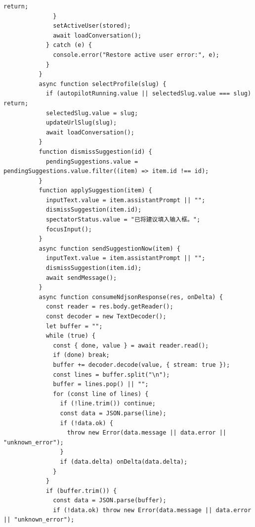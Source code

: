 \documentclass[12pt,a4paper]{article}
\begin{document}
\begin{Verbatim}[fontsize=\footnotesize]
                return;
              }
              setActiveUser(stored);
              await loadConversation();
            } catch (e) {
              console.error("Restore active user error:", e);
            }
          }
          async function selectProfile(slug) {
            if (autopilotRunning.value || selectedSlug.value === slug) return;
            selectedSlug.value = slug;
            updateUrlSlug(slug);
            await loadConversation();
          }
          function dismissSuggestion(id) {
            pendingSuggestions.value = pendingSuggestions.value.filter((item) => item.id !== id);
          }
          function applySuggestion(item) {
            inputText.value = item.assistantPrompt || "";
            dismissSuggestion(item.id);
            spectatorStatus.value = "已将建议填入输入框。";
            focusInput();
          }
          async function sendSuggestionNow(item) {
            inputText.value = item.assistantPrompt || "";
            dismissSuggestion(item.id);
            await sendMessage();
          }
          async function consumeNdjsonResponse(res, onDelta) {
            const reader = res.body.getReader();
            const decoder = new TextDecoder();
            let buffer = "";
            while (true) {
              const { done, value } = await reader.read();
              if (done) break;
              buffer += decoder.decode(value, { stream: true });
              const lines = buffer.split("\n");
              buffer = lines.pop() || "";
              for (const line of lines) {
                if (!line.trim()) continue;
                const data = JSON.parse(line);
                if (!data.ok) {
                  throw new Error(data.message || data.error || "unknown_error");
                }
                if (data.delta) onDelta(data.delta);
              }
            }
            if (buffer.trim()) {
              const data = JSON.parse(buffer);
              if (!data.ok) throw new Error(data.message || data.error || "unknown_error");
\end{Verbatim}
\newpage
{}
\fancyhead[R]{}
\end{document}
